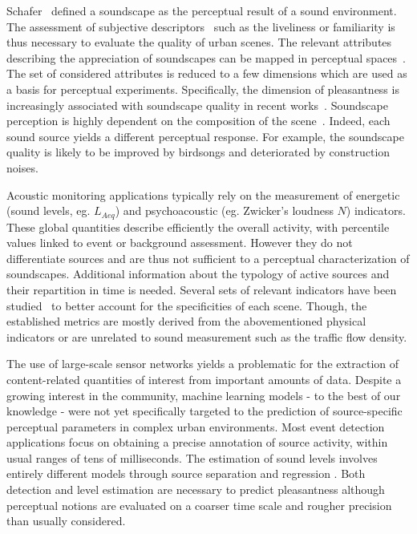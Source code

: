 \documentclass{article}
\begin{document}
\begin{sloppy}
Schafer~\cite{schafer1977} defined a soundscape as the perceptual result of a sound environment. The assessment of subjective descriptors~\cite{berglund2006, brown2011, aletta2016} such as the liveliness or familiarity is thus necessary to evaluate the quality of urban scenes. The relevant attributes describing the appreciation of soundscapes can be mapped in perceptual spaces~\cite{axelsson2010, cain2013}. The set of considered attributes is reduced to a few dimensions which are used as a basis for perceptual experiments. Specifically, the dimension of pleasantness is increasingly associated with soundscape quality in recent works~\cite{decoensel2006, delaitre2014, ricciardi2014, aumond2017}. Soundscape perception is highly dependent on the composition of the scene~\cite{lavandier2006, nilsson2006}. Indeed, each sound source yields a different perceptual response. For example, the soundscape quality is likely to be improved by birdsongs and deteriorated by construction noises.

Acoustic monitoring applications typically rely on the measurement of energetic (sound levels, eg. $L_{Aeq}$) and psychoacoustic (eg. Zwicker's loudness $N$) indicators. These global quantities describe efficiently the overall activity, with percentile values linked to event or background assessment. However they do not differentiate sources and are thus not sufficient to a perceptual characterization of soundscapes. Additional information about the typology of active sources and their repartition in time is needed. Several sets of relevant indicators have been studied~\cite{can2008, can2016, brocolini2013} to better account for the specificities of each scene. Though, the established metrics are mostly derived from the abovementioned physical indicators or are unrelated to sound measurement such as the traffic flow density.

The use of large-scale sensor networks yields a problematic for the extraction of content-related quantities of interest from important amounts of data. Despite a growing interest in the community, machine learning models - to the best of our knowledge - were not yet specifically targeted to the prediction of source-specific perceptual parameters in complex urban environments. Most event detection applications focus on obtaining a precise annotation of source activity, within usual ranges of tens of milliseconds. The estimation of sound levels involves entirely different models through source separation and regression \cite{gloaguen2016}. Both detection and level estimation are necessary to predict pleasantness although perceptual notions are evaluated on a coarser time scale and rougher precision than usually considered.


\end{sloppy}
\end{document}
